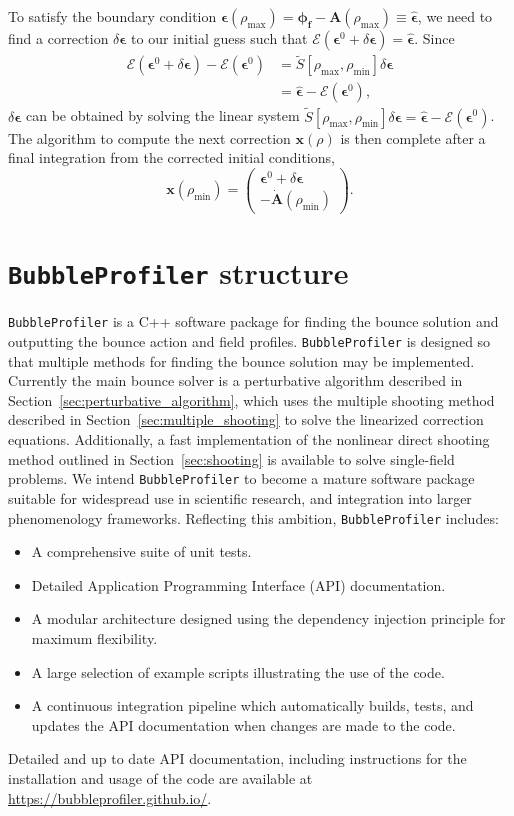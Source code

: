 \documentclass[final,3p,11pt,pdflatex]{elsarticle}
\makeatletter
\newcommand{\docspage}{%
  \url{https://bubbleprofiler.github.io/}\xspace}
\newcommand{\bp}{\texttt{BubbleProfiler}\@\xspace}
\newcommand{\secref}[1]{Section~\ref{#1}}
\newcommand{\fv}{\ensuremath{\phi_f}}
\newcommand{\rhomin}{\ensuremath{\rho_{\text{min}}}}
\newcommand{\rhomax}{\ensuremath{\rho_{\text{max}}}}
\makeatother
\begin{document}
To satisfy the boundary condition $\bm{\epsilon}(\rhomax) = \bm{\fv}
- \bm{A}(\rhomax) \equiv \hat{\bm{\epsilon}}$, we need to find a
correction $\delta\bm{\epsilon}$ to our initial guess such that
$\mathcal{E}(\bm{\epsilon}^0
+ \delta \bm{\epsilon}) = \hat{\bm{\epsilon}}$.  Since
%
\begin{align}
  \mathcal{E}(\bm{\epsilon}^0 + \delta\bm{\epsilon})
  - \mathcal{E}(\bm{\epsilon}^0) &=
  \tilde{S}[\rhomax,\rhomin]\delta\bm{\epsilon} \\
&= \hat{\bm{\epsilon}} - \mathcal{E}(\bm{\epsilon}^0), \nonumber
\end{align}
%
$\delta\bm{\epsilon}$ can be obtained by solving the linear system
$\tilde{S}[\rhomax,\rhomin]\delta\bm{\epsilon} = \hat{\bm{\epsilon}}
- \mathcal{E}(\bm{\epsilon}^0)$.  The algorithm to compute the next
correction $\bm{x}(\rho)$ is then complete after a final integration
from the corrected initial conditions,
%
\begin{equation}
\bm{x}(\rhomin) = \begin{pmatrix}
\bm{\epsilon}^0 + \delta \bm{\epsilon} \\
-\dot{\bm{A}}(\rhomin)
\end{pmatrix}.
\end{equation}

\section{\bp structure}\label{sec:structure}

\bp is a C++ software package for finding the bounce solution and
outputting the bounce action and field profiles. \bp is designed so
that multiple methods for finding the bounce solution may be
implemented.  Currently the main bounce solver is a perturbative
algorithm described in \secref{sec:perturbative_algorithm}, which uses
the multiple shooting method described in
\secref{sec:multiple_shooting} to solve the linearized correction
equations.  Additionally, a fast implementation of the nonlinear
direct shooting method outlined in \secref{sec:shooting} is available
to solve single-field problems.  We intend \bp to become a mature
software package suitable for widespread use in scientific research,
and integration into larger phenomenology frameworks.  Reflecting this
ambition, \bp includes:
%
\begin{itemize}
\item A comprehensive suite of unit tests.
\item Detailed Application Programming Interface (API) documentation.
\item A modular architecture designed using the dependency injection principle
  for maximum flexibility.
\item A large selection of example scripts illustrating the use of the code.
\item A continuous integration pipeline which automatically builds, tests, and
  updates the API documentation when changes are made to the code.
\end{itemize}
Detailed and up to date API documentation, including instructions for the
installation and usage of the code are available at \docspage.
\end{document}
